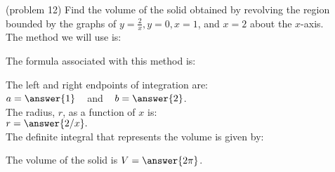 \documentclass[handout]{ximera}
\begin{document}
\begin{problem}(problem 12)
Find the volume of the solid obtained by revolving the region bounded by the graphs of $y = \frac{2}{x}, y = 0, x = 1$, and $x = 2$ about the $x$-axis.\\
The method we will use is:
\begin{multipleChoice}
\end{multipleChoice}

The formula associated with this method is:
\begin{multipleChoice}
\end{multipleChoice}

The left and right endpoints of integration are:\\
$a = \answer{1}\;\;\;$ and $\;\;\; b = \answer{2}$.\\
The radius, $r$, as a function of $x$ is:\\
$r = \answer{2/x}.$\\

The definite integral that represents the volume is given by:\\
\begin{multipleChoice}
\end{multipleChoice}

The volume of the solid is $V = \answer{2\pi}$.

\end{problem}
\end{document}
